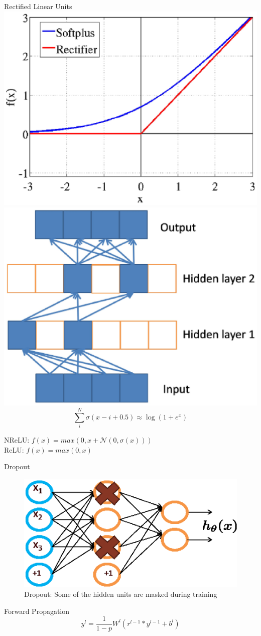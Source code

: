 \documentclass{beamer}
\begin{document}
\begin{frame}{Rectified Linear Units}
\includegraphics[width = .45\linewidth]{Figures/ReLU-acts.eps}
\includegraphics[width = .45\linewidth]{Figures/ReLU-grads.eps}
$$ \sum_{i}^{N} \sigma(x-i+0.5) \approx \log(1+e^{x})$$
\begin{center}
  NReLU: $ f(x) = max(0,x + \mathcal{N}(0,\sigma(x)))$\\
  ReLU: $f(x) = max(0,x) $
\end{center}
\end{frame}

\begin{frame}{Dropout}
\begin{figure}
\begin{center}  
  \includegraphics[scale=0.5]{Figures/dropout.eps}
\end{center}
\caption{Dropout: Some of the hidden units are masked during training}
\end{figure}
{ Forward Propagation}
$$y^{l} = \frac{1}{1-p}W^{l}(r^{l-1} * y^{l-1} + b^{l})$$
\end{frame}
\end{document}
